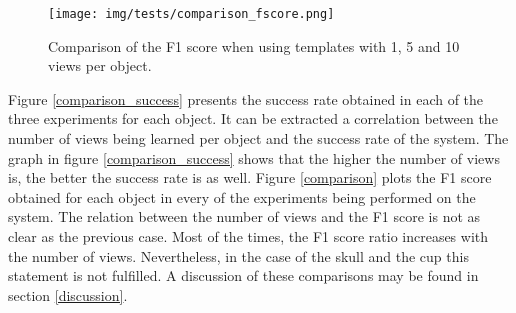 	\begin{figure}[H]
		\begin{center}
	    \texttt{[image: img/tests/comparison\_fscore.png]}
		\caption[Comparison of the F1 score]{Comparison of the F1 score when using templates with 1, 5 and 10 views per object.}
		\label{comparison_fscore}
		\end{center}
	\end{figure}

	Figure \ref{comparison_success} presents the success rate obtained in each of the three experiments for each object. 
	It can be extracted a correlation between the number of views being learned per object and the success rate of the system. 
	The graph in figure \ref{comparison_success} shows that the higher the number of views is, the better the success rate is as well. 
	Figure \ref{comparison} plots the F1 score obtained for each object in every of the experiments being performed on the system. 
	The relation between the number of views and the F1 score is not as clear as the previous case. 
	Most of the times, the F1 score ratio increases with the number of views. 
	Nevertheless, in the case of the skull and the cup this statement is not fulfilled. 
	A discussion of these comparisons may be found in section \ref{discussion}.
